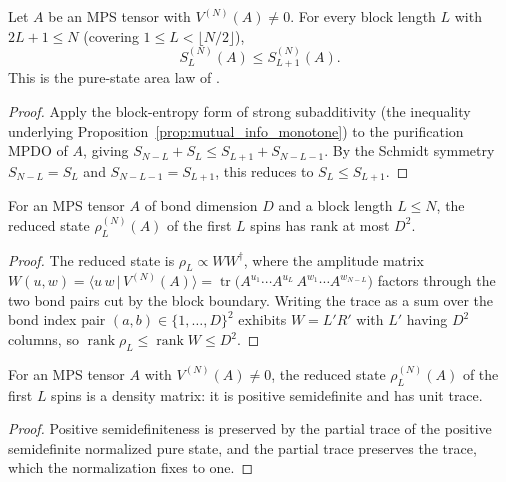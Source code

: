 \begin{proposition}\label{prop:pure_area_monotone}
    \leanok
    Let $A$ be an MPS tensor with $V^{(N)}(A)\neq 0$. For every block length $L$
    with $2L+1\le N$ (covering $1\le L<\lfloor N/2\rfloor$),
    \[
        S_L^{(N)}(A) \le S_{L+1}^{(N)}(A).
    \]
    This is the pure-state area law of \cite[Section~3, line~599]{Cirac2016MPDO_arXiv}.
\end{proposition}
\begin{proof}\leanok
    Apply the block-entropy form of strong subadditivity (the inequality
    underlying Proposition~\ref{prop:mutual_info_monotone}) to the purification
    MPDO of $A$, giving $S_{N-L} + S_L \le S_{L+1} + S_{N-L-1}$. By the Schmidt
    symmetry $S_{N-L} = S_L$ and $S_{N-L-1} = S_{L+1}$, this reduces to
    $S_L \le S_{L+1}$.
\end{proof}

\begin{lemma}\label{lem:operator_schmidt_rank}
    \leanok
    For an MPS tensor $A$ of bond dimension $D$ and a block length $L\le N$, the
    reduced state $\rho_L^{(N)}(A)$ of the first $L$ spins has rank at most $D^2$.
\end{lemma}
\begin{proof}\leanok
    The reduced state is $\rho_L \propto W W^\dagger$, where the amplitude matrix
    $W(u, w) = \langle u\,w\,|\,V^{(N)}(A)\rangle = \operatorname{tr}
        \bigl(A^{u_1}\cdots A^{u_L}\, A^{w_1}\cdots A^{w_{N-L}}\bigr)$ factors through
    the two bond pairs cut by the block boundary. Writing the trace as a sum over
    the bond index pair $(a, b)\in\{1,\dots,D\}^2$ exhibits $W = L'R'$ with $L'$
    having $D^2$ columns, so $\operatorname{rank}\rho_L \le \operatorname{rank} W
        \le D^2$.
\end{proof}

\begin{lemma}
    \label{lem:reduced_pure_block_state_density}
    \leanok
    For an MPS tensor $A$ with $V^{(N)}(A)\neq 0$, the reduced state $\rho_L^{(N)}(A)$ of
    the first $L$ spins is a density matrix: it is positive semidefinite and has unit
    trace.
\end{lemma}
\begin{proof}\leanok
    Positive semidefiniteness is preserved by the partial trace of the positive
    semidefinite normalized pure state, and the partial trace preserves the trace, which
    the normalization fixes to one.
\end{proof}

